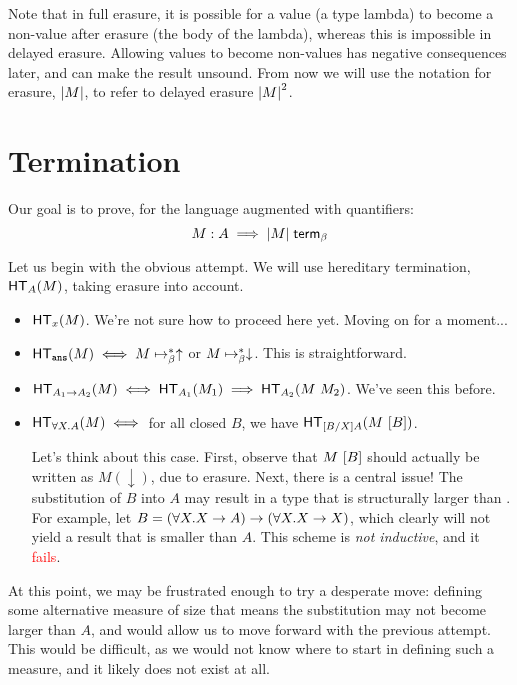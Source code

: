 \documentclass{article}
\begin{document}
Note that in full erasure, it is possible for a value (a type lambda) to become a non-value after
erasure (the body of the lambda), whereas this is impossible in delayed erasure. Allowing values
to become non-values has negative consequences later, and can make the result unsound. From now we
will use the notation for erasure, $|M|$, to refer to delayed erasure ${|M|}^2$.

\section{Termination}

Our goal is to prove, for the language augmented with quantifiers:
\[ M : A \implies {\ensuremath{|M|}} \; \mathsf{term}_{\beta} \]

Let us begin with the obvious attempt. We will use hereditary termination, $\mathsf{HT}_{A}(M)$, taking
erasure into account.

\begin{proofattempt}
\begin{itemize}
\item $\mathsf{HT}_{x}(M)$.
      We're not sure how to proceed here yet. Moving on for a moment...

\item $\mathsf{HT}_{\texttt{ans}}(M) \iff M \mapsto_{\beta}^* \uparrow$ or $M \mapsto_{\beta}^* \downarrow$.
      This is straightforward.

\item $\mathsf{HT}_{A_1 \to A_2}(M) \iff \mathsf{HT}_{A_1}(M_1) \implies \mathsf{HT}_{A_2}(M\ M_2)$.
      We've seen this before.

\item $\mathsf{HT}_{\forall X. A}(M) \iff $ for all closed $B$, we have $\mathsf{HT}_{[B/X]A}(M\ [B])$.

      Let's think about this case. First, observe that $M\ [B]$ should actually be written as
      $M(\downarrow)$, due to erasure. Next, there is a central issue!
      The substitution of $B$ into $A$ may result in a type that is structurally larger than
      . For example, let $B=(\forall X. X \to A) \to (\forall X. X \to X)$, which
      clearly will not yield a result that is smaller than $A$. This scheme is \emph{not inductive},
      and it \textcolor{red}{fails}.
\end{itemize}
\end{proofattempt}

At this point, we may be frustrated enough to try a desperate move: defining some alternative
measure of size that means the substitution may not become larger than $A$, and would allow us to
move forward with the previous attempt. This would be difficult, as we would not know where to
start in defining such a measure, and it likely does not exist at all.
\end{document}
